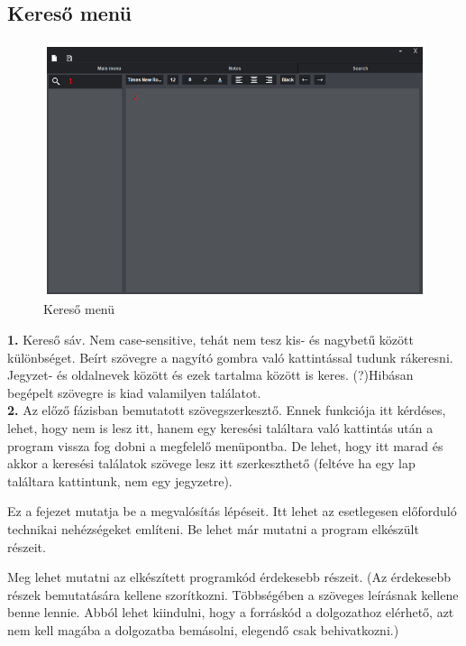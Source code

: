 \subsection{Kereső menü}

\begin{figure}[h]
	\centering
	\includegraphics[scale=0.7]{images/menu_4.png}
	\caption{Kereső menü}
	\label{fig:menu_search}
\end{figure}

\vspace{5pt} \noindent \textbf{1.} Kereső sáv. Nem case-sensitive, tehát nem tesz kis- és nagybetű között különbséget. Beírt szövegre a nagyító gombra való kattintással tudunk rákeresni. Jegyzet- és oldalnevek között és ezek tartalma között is keres. (?)Hibásan begépelt szövegre is kiad valamilyen találatot.
\vspace{5pt} \\ \textbf{2.} Az előző fázisban bemutatott szövegszerkesztő. Ennek funkciója itt kérdéses, lehet, hogy nem is lesz itt, hanem egy keresési találtara való kattintás után a program vissza fog dobni a megfelelő menüpontba. De lehet, hogy itt marad és akkor a keresési találatok szövege lesz itt szerkeszthető (feltéve ha egy lap találtara kattintunk, nem egy jegyzetre).




\newpage
Ez a fejezet mutatja be a megvalósítás lépéseit.
Itt lehet az esetlegesen előforduló technikai nehézségeket említeni.
Be lehet már mutatni a program elkészült részeit.

Meg lehet mutatni az elkészített programkód érdekesebb részeit.
(Az érdekesebb részek bemutatására kellene szorítkozni.
Többségében a szöveges leírásnak kellene benne lennie.
Abból lehet kiindulni, hogy a forráskód a dolgozathoz elérhető, azt nem kell magába a dolgozatba bemásolni, elegendő csak behivatkozni.)


